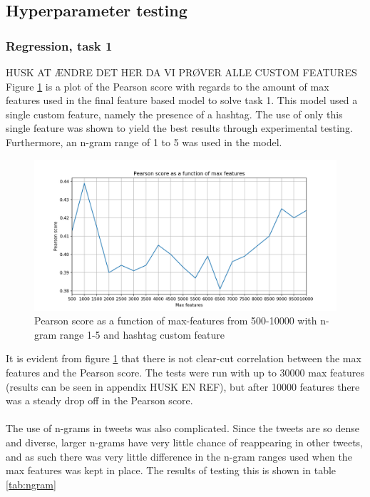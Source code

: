 \subsection{Hyperparameter testing}
\subsubsection{Regression, task 1}
HUSK AT ÆNDRE DET HER DA VI PRØVER ALLE CUSTOM FEATURES\\
Figure \ref{fig:max_f_ngram15_hashtag} is a plot of the Pearson score with regards to the amount of max features used in the final feature based model to solve task 1. This model used a single custom feature, namely the presence of a hashtag. The use of only this single feature was shown to yield the best results through experimental testing. Furthermore, an n-gram range of 1 to 5 was used in the model.
\begin{figure}[H]
    \centering
        \includegraphics[width=\textwidth]{pictures/max_f_ngram15_hashtag.png}
        \caption{Pearson score as a function of max-features from 500-10000 with n-gram range 1-5 and hashtag custom feature}
        \label{fig:max_f_ngram15_hashtag}
\end{figure}
It is evident from figure \ref{fig:max_f_ngram15_hashtag} that there is not clear-cut correlation between the max features and the Pearson score. The tests were run with up to 30000 max features (results can be seen in appendix HUSK EN REF), but after 10000 features there was a steady drop off in the Pearson score.\\
\\
The use of n-grams in tweets was also complicated. Since the tweets are so dense and diverse, larger n-grams have very little chance of reappearing in other tweets, and as such there was very little difference in the n-gram ranges used when the max features was kept in place. The results of testing this is shown in table \ref{tab:ngram}\\
